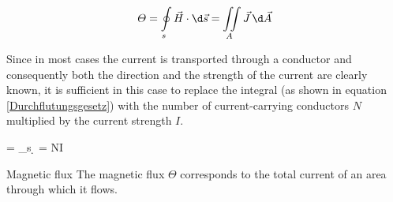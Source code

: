 \begin{frame}
{		\begin{equation}
			\varTheta = \oint\limits_s \vec{H}\cdot \d\vec{s} = \iint\limits_A \vec{J}\,\d\vec{A}\label{Durchflutung}
		\end{equation}

        Since in most cases the current is transported through a conductor and consequently both the direction and the strength of the current are clearly known, it is sufficient in this case to replace the integral
		(as shown in equation \ref{Durchflutungsgesetz}) with the number of current-carrying conductors $N$ multiplied by the current strength $I$.
		\begin{eq}
			\varTheta = \oint\limits_s \cdot \d{} = N\cdot I\label{Durchflutungsgesetz} \qquad [\mathrm{A}]
		\end{eq}

		\begin{Key point}{Magnetic flux}
            The magnetic flux $\varTheta$ corresponds to the total current of an area through which it flows.
		\end{Key point}

}
\end{frame}
